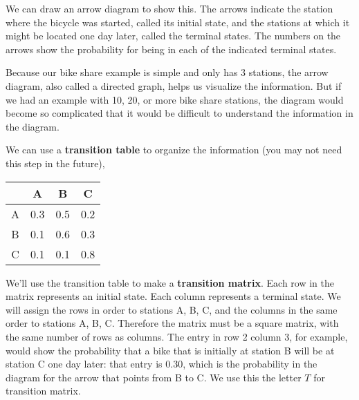 We can draw an arrow diagram to show this. The arrows indicate the station where the bicycle was started, called its initial state, and the stations at which it might be located one day later, called the terminal states. The numbers on the arrows show the probability for being in each of the indicated terminal states.

\begin{center}
\end{center}

Because our bike share example is simple and only has 3 stations, the arrow diagram, also called a directed graph, helps us visualize the information. But if we had an example with 10, 20, or more bike share stations, the diagram would become so complicated that it would be difficult to understand the information in the diagram.

We can use a \textbf{transition table} to organize the information (you may not need this step in the future),
\begin{center}
    \begin{tabular}{c|ccc}
          & A   & B   & C   \\
        \hline
        A & 0.3 & 0.5 & 0.2 \\
        B & 0.1 & 0.6 & 0.3 \\
        C & 0.1 & 0.1 & 0.8 \\
    \end{tabular}
\end{center}

We'll use the transition table to make a \textbf{transition matrix}. Each row in the matrix represents an initial state. Each column represents a terminal state. We will assign the rows in order to stations A, B, C, and the columns in the same order to stations A, B, C. Therefore the matrix must be a square matrix, with the same number of rows as columns. The entry in row 2 column 3, for example, would show the probability that a bike that is initially at station B will be at station C one day later: that entry is $0.30$, which is the probability in the diagram for the arrow that points from B to C. We use this the letter \( T \) for transition matrix.

